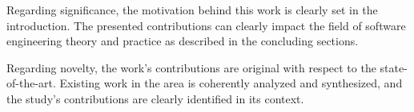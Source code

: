 \documentclass[12pt,english]{reviewresponse}
\begin{document}
\begin{revcomment}
Regarding significance, the motivation behind this work is clearly set in the introduction. The presented contributions can clearly impact the field of software engineering theory and practice as described in the concluding sections.
\end{revcomment}
\begin{revresponse}
\end{revresponse}

\begin{revcomment}
Regarding novelty, the work's contributions are original with respect to the state-of-the-art. Existing work in the area is coherently analyzed and synthesized, and the study's contributions are clearly identified in its context.
\end{revcomment}
\begin{revresponse}
\end{revresponse}
\end{document}
